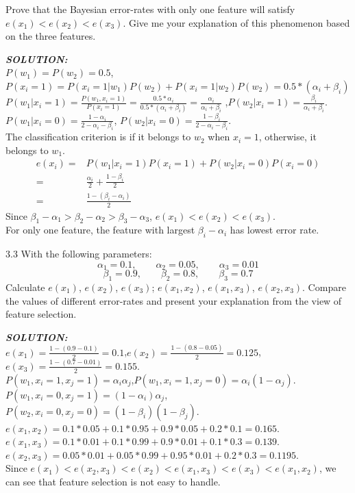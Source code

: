 \documentclass{article}
\theoremstyle{definition}
\theoremstyle{definition}
\theoremstyle{remark}
\begin{document}
Prove that the Bayesian error-rates with only one feature will satisfy $e(x_{1})<e(x_{2})<e(x_{3})$. Give me your explanation of this phenomenon based on the three features.

\emph{\textbf{SOLUTION:}}\\
$P(w_1)=P(w_2)=0.5$,$P(x_i=1)=P(x_{i}=1|w_{1})P(w_2)+P(x_{i}=1|w_{2})P(w_2)=0.5*(\alpha_i+\beta_i)$\\
$P(w_1|x_{i}=1)=\frac{P(w_1,x_i=1)}{P(x_i=1)}=\frac{0.5*\alpha_i}{0.5*(\alpha_i+\beta_i)}=\frac{\alpha_i}{\alpha_i+\beta_i}$
,$P(w_2|x_{i}=1)=\frac{\beta_i}{\alpha_i+\beta_i}$.\\
$P(w_1|x_{i}=0)=\frac{1-\alpha_i}{2-\alpha_i-\beta_i}$,
$P(w_2|x_{i}=0)=\frac{1-\beta_i}{2-\alpha_i-\beta_i}$.\\
The classification criterion is if it belongs to $w_2$ when $x_i=1$, otherwise, it belongs to $w_1$.\\
\begin{equation}\nonumber
\begin{aligned}
e(x_i) =& P(w_1|x_{i}=1)P(x_{i}=1)+P(w_2|x_{i}=0)P(x_{i}=0)\\
=& \frac{\alpha_i}{2}+\frac{1-\beta_i}{2} \\
=& \frac{1-(\beta_i-\alpha_i)}{2}
\end{aligned}
\end{equation}
Since $\beta_{1}-\alpha_{1}>\beta_{2}-\alpha_{2}>\beta_{3}-\alpha_{3}$, $e(x_1)<e(x_2)<e(x_3)$.\\
For only one feature, the feature with largest $\beta_i-\alpha_i$ has lowest error rate.

3.3 With the following parameters:
\[
\alpha_{1}=0.1,\qquad \alpha_{2}=0.05,\qquad \alpha_{3}=0.01
\]\[
\beta_{1}=0.9,\qquad \beta_{2}=0.8,\qquad \beta_{3}=0.7
\]
Calculate $e(x_{1})$, $e(x_{2})$, $e(x_{3})$; $e(x_{1}, x_{2})$, $e(x_{1}, x_{3})$, $e(x_{2}, x_{3})$. Compare the values of different error-rates and present your explanation from the view of feature selection.

\emph{\textbf{SOLUTION:}}\\
$e(x_1)=\frac{1-(0.9-0.1)}{2}=0.1$,$e(x_2)=\frac{1-(0.8-0.05)}{2}=0.125$,$e(x_3)=\frac{1-(0.7-0.01)}{2}=0.155$.\\
$P(w_1,x_i=1,x_j=1)=\alpha_i\alpha_j$,$P(w_1,x_i=1,x_j=0)=\alpha_i(1-\alpha_j)$.\\
$P(w_1,x_i=0,x_j=1)=(1-\alpha_i)\alpha_j$,$P(w_2,x_i=0,x_j=0)=(1-\beta_i)(1-\beta_j)$.\\
$e(x_1,x_2)=0.1*0.05+0.1*0.95+0.9*0.05+0.2*0.1=0.165.$\\
$e(x_1,x_3)=0.1*0.01+0.1*0.99+0.9*0.01+0.1*0.3=0.139.$\\
$e(x_2,x_3)=0.05*0.01+0.05*0.99+0.95*0.01+0.2*0.3=0.1195.$\\
Since $e(x_1)<e(x_2,x_3)<e(x_2)<e(x_1,x_3)<e(x_3)<e(x_1,x_2)$, we can see that feature selection is not easy to handle.
\end{document}

